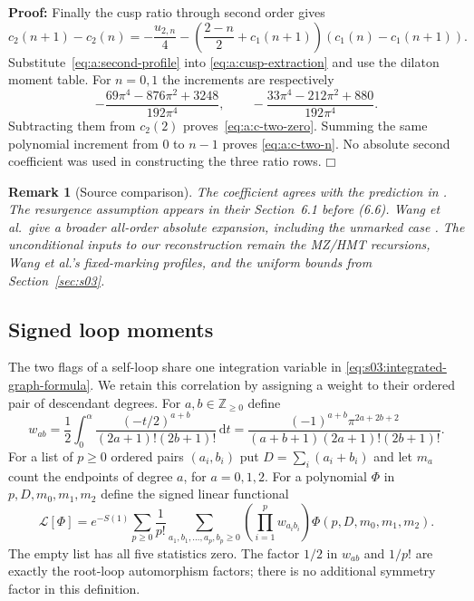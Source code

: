 \documentclass[a4paper,10pt]{article}
\numberwithin{equation}{section}
\newcommand{\dd}{\mathrm{d}}
\theoremstyle{paperplain}
\theoremstyle{paperremark}
\newtheorem{rmk}{Remark}[section]
\theoremstyle{paperplain}
\newenvironment{prf}{\noindent \textbf{Proof: }}{\hfill $\mdlgwhtsquare$\par\addvspace{0.5\baselineskip}}
\begin{document}
\begin{prf}
Finally the cusp ratio through second order gives
\[
 c_2(n+1)-c_2(n)=-\frac{u_{2,n}}4
 -\left(\frac{2-n}{2}+c_1(n+1)\right)
                         (c_1(n)-c_1(n+1)).
\]
Substitute~\eqref{eq:a:second-profile} into
\eqref{eq:a:cusp-extraction} and use the dilaton moment table.
For $n=0,1$ the increments are respectively
\[
 -\frac{69\pi^4-876\pi^2+3248}{192\pi^4},\qquad
 -\frac{33\pi^4-212\pi^2+880}{192\pi^4}.
\]
Subtracting them from $c_2(2)$ proves~\eqref{eq:a:c-two-zero}.
Summing the same polynomial increment from $0$ to $n-1$ proves
\eqref{eq:a:c-two-n}. No absolute second coefficient was used in
constructing the three ratio rows.
\end{prf}

\begin{rmk}[Source comparison]
The coefficient agrees with the prediction in \cite[(6.10)]{EGGLS24}.
The resurgence assumption appears in their Section~6.1 before (6.6).
Wang et al.\ give a broader all-order absolute expansion, including
the unmarked case \cite[Theorem~1.1 and (11.6)--(11.7)]{W26v5}.
The unconditional inputs to our reconstruction remain the MZ/HMT
recursions, Wang et al.'s fixed-marking profiles, and the uniform
bounds from Section~\ref{sec:s03}.
\end{rmk}

\subsection{Signed loop moments}
\label{subsec:a:02}

The two flags of a self-loop share one integration variable in
\eqref{eq:s03:integrated-graph-formula}. We retain this correlation by
assigning a weight to their ordered pair of descendant degrees. For
$a,b\in\mathbb Z_{\geq0}$ define
\begin{equation}\label{eq:a:paired-weight}
 w_{ab}=\frac12\int_0^{\alpha}
       \frac{(-t/2)^{a+b}}{(2a+1)!(2b+1)!}\,\dd t
 =\frac{(-1)^{a+b}\pi^{2a+2b+2}}
 {(a+b+1)(2a+1)!(2b+1)!}.
\end{equation}
For a list of $p\geq0$ ordered pairs $(a_i,b_i)$ put
$D=\sum_i(a_i+b_i)$ and let $m_a$ count the endpoints of degree $a$,
for $a=0,1,2$. For a polynomial $\Phi$ in $p,D,m_0,m_1,m_2$ define
the signed linear functional
\begin{equation}\label{eq:a:signed-functional}
 \mathcal L[\Phi]=e^{-S(1)}\sum_{p\geq0}\frac1{p!}
 \sum_{a_1,b_1,\ldots,a_p,b_p\geq0}
       \left(\prod_{i=1}^p w_{a_i b_i}\right)
       \Phi(p,D,m_0,m_1,m_2).
\end{equation}
The empty list has all five statistics zero. The factor $1/2$ in
$w_{ab}$ and $1/p!$ are exactly the root-loop automorphism factors;
there is no additional symmetry factor in this definition.
\end{document}
